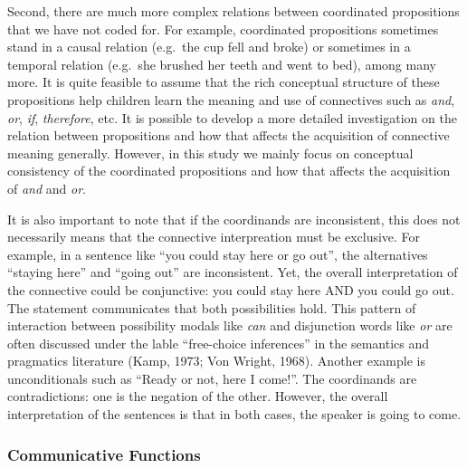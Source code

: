 \documentclass[oneside]{report}
\theoremstyle{definition}
\theoremstyle{definition}
\theoremstyle{definition}
\theoremstyle{remark}
\begin{document}
Second, there are much more complex relations between coordinated
propositions that we have not coded for. For example, coordinated
propositions sometimes stand in a causal relation (e.g.~the cup fell and
broke) or sometimes in a temporal relation (e.g.~she brushed her teeth
and went to bed), among many more. It is quite feasible to assume that
the rich conceptual structure of these propositions help children learn
the meaning and use of connectives such as \emph{and}, \emph{or},
\emph{if}, \emph{therefore}, etc. It is possible to develop a more
detailed investigation on the relation between propositions and how that
affects the acquisition of connective meaning generally. However, in
this study we mainly focus on conceptual consistency of the coordinated
propositions and how that affects the acquisition of \emph{and} and
\emph{or}.

It is also important to note that if the coordinands are inconsistent,
this does not necessarily means that the connective interpreation must
be exclusive. For example, in a sentence like ``you could stay here or
go out'', the alternatives ``staying here'' and ``going out'' are
inconsistent. Yet, the overall interpretation of the connective could be
conjunctive: you could stay here AND you could go out. The statement
communicates that both possibilities hold. This pattern of interaction
between possibility modals like \emph{can} and disjunction words like
\emph{or} are often discussed under the lable ``free-choice inferences''
in the semantics and pragmatics literature (Kamp, 1973; Von Wright,
1968). Another example is unconditionals such as ``Ready or not, here I
come!''. The coordinands are contradictions: one is the negation of the
other. However, the overall interpretation of the sentences is that in
both cases, the speaker is going to come.

\subsubsection{Communicative Functions}\label{communicative-functions}
\end{document}

